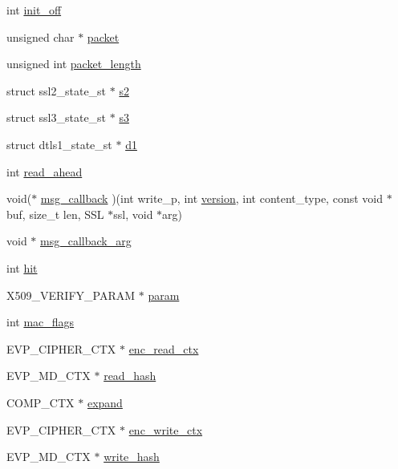 \begin{DoxyCompactItemize}
\item 
int \hyperlink{structssl__st_a828422d492ba318c1985327ca8a6f219}{init\-\_\-off}
\item 
unsigned char $\ast$ \hyperlink{structssl__st_a5b43e468488be2327eac1c4396b568bc}{packet}
\item 
unsigned int \hyperlink{structssl__st_ae52697ae4cfec851e2b0d2c5ccaa1df7}{packet\-\_\-length}
\item 
struct ssl2\-\_\-state\-\_\-st $\ast$ \hyperlink{structssl__st_a19bb259618f022fae28970b385507815}{s2}
\item 
struct ssl3\-\_\-state\-\_\-st $\ast$ \hyperlink{structssl__st_a2e2d2f47c0ac86c4329cc8035b3e4688}{s3}
\item 
struct dtls1\-\_\-state\-\_\-st $\ast$ \hyperlink{structssl__st_afd70ab79ea0917b56fa74a8cb04ddaca}{d1}
\item 
int \hyperlink{structssl__st_a6be4ea32cec16e0cfb2034f1d8fc3f37}{read\-\_\-ahead}
\item 
void($\ast$ \hyperlink{structssl__st_aae9235fbb945ca49fcc8401a7fc1746f}{msg\-\_\-callback} )(int write\-\_\-p, int \hyperlink{structssl__st_a104b2a57e68e7e8c228c34d9ffb0e3dd}{version}, int content\-\_\-type, const void $\ast$buf, size\-\_\-t len, S\-S\-L $\ast$ssl, void $\ast$arg)
\item 
void $\ast$ \hyperlink{structssl__st_a265c0d1adbd1e76b1b326a1f82b0cfcf}{msg\-\_\-callback\-\_\-arg}
\item 
int \hyperlink{structssl__st_a20d2f2c7a00b1fd70c28c81c2d6f34c2}{hit}
\item 
X509\-\_\-\-V\-E\-R\-I\-F\-Y\-\_\-\-P\-A\-R\-A\-M $\ast$ \hyperlink{structssl__st_a384d0d3915209d3d4c8144146bab78aa}{param}
\item 
int \hyperlink{structssl__st_a501b23b52ff9106b5cba654187324d95}{mac\-\_\-flags}
\item 
E\-V\-P\-\_\-\-C\-I\-P\-H\-E\-R\-\_\-\-C\-T\-X $\ast$ \hyperlink{structssl__st_ae2efb2324ed8b45b65cc2a3aa5ac1a4d}{enc\-\_\-read\-\_\-ctx}
\item 
E\-V\-P\-\_\-\-M\-D\-\_\-\-C\-T\-X $\ast$ \hyperlink{structssl__st_af550f07608665dad2b09a83c42ce494c}{read\-\_\-hash}
\item 
C\-O\-M\-P\-\_\-\-C\-T\-X $\ast$ \hyperlink{structssl__st_a01fd32f00c26a995e998b0ad8edb38cf}{expand}
\item 
E\-V\-P\-\_\-\-C\-I\-P\-H\-E\-R\-\_\-\-C\-T\-X $\ast$ \hyperlink{structssl__st_a44444bb7794521afc2b9e52cd0c2570c}{enc\-\_\-write\-\_\-ctx}
\item 
E\-V\-P\-\_\-\-M\-D\-\_\-\-C\-T\-X $\ast$ \hyperlink{structssl__st_a491e1c0b9386b4003bb443af4a2d06d4}{write\-\_\-hash}

\end{DoxyCompactItemize}
